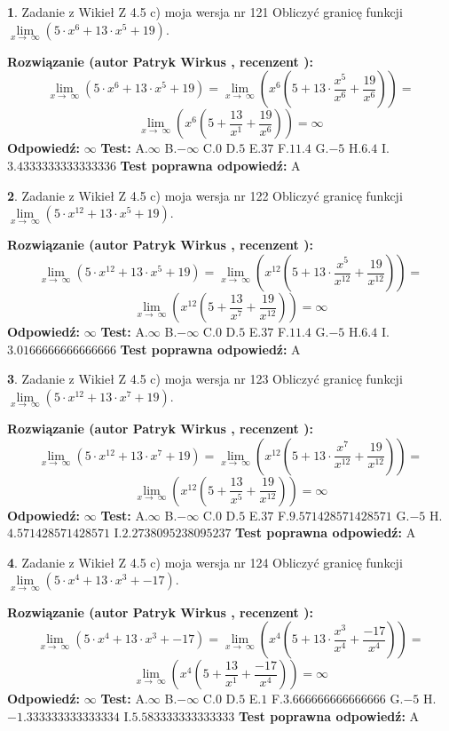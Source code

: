 \documentclass[12pt, a4paper]{article}
\theoremstyle{definition} %
\newtheorem{zad}{}
\newcommand{\zadStart}[1]{\begin{zad}#1\newline}
\newcommand{\zadStop}{\end{zad}}
\newcommand{\rozwStart}[2]{\noindent \textbf{Rozwiązanie (autor #1 , recenzent #2): }\newline}
\newcommand{\rozwStop}{\newline}
\newcommand{\odpStart}{\noindent \textbf{Odpowiedź:}\newline}
\newcommand{\odpStop}{\newline}
\newcommand{\testStart}{\noindent \textbf{Test:}\newline}
\newcommand{\testStop}{\newline}
\newcommand{\kluczStart}{\noindent \textbf{Test poprawna odpowiedź:}\newline}
\newcommand{\kluczStop}{\newline}
\begin{document}
\zadStart{Zadanie z Wikieł Z 4.5 c) moja wersja nr 121}
Obliczyć granicę funkcji  $\lim\limits_{x\to\ \infty}(5 \cdot x^{6}+13 \cdot x^{5}+19)$.
\zadStop
\rozwStart{Patryk Wirkus}{}
$$\lim\limits_{x\to\ \infty}(5 \cdot x^{6}+13 \cdot x^{5}+19) = \lim\limits_{x\to\ \infty}(x^{6}(5 +13 \cdot \frac{x^{5}}{x^{6}}+\frac{19}{x^{6}})) =$$ $$\lim\limits_{x\to\ \infty}(x^{6}(5 +\frac{13}{x^{1}}+\frac{19}{x^{6}})) =\infty$$
\rozwStop
\odpStart
$\infty$
\odpStop
\testStart
A.$\infty$ B.$-\infty$ C.$0$ D.$5$ E.$37$
F.$11.4$ G.$-5$
H.$6.4$
I.$3.4333333333333336$
\testStop
\kluczStart
A
\kluczStop



\zadStart{Zadanie z Wikieł Z 4.5 c) moja wersja nr 122}
Obliczyć granicę funkcji  $\lim\limits_{x\to\ \infty}(5 \cdot x^{12}+13 \cdot x^{5}+19)$.
\zadStop
\rozwStart{Patryk Wirkus}{}
$$\lim\limits_{x\to\ \infty}(5 \cdot x^{12}+13 \cdot x^{5}+19) = \lim\limits_{x\to\ \infty}(x^{12}(5 +13 \cdot \frac{x^{5}}{x^{12}}+\frac{19}{x^{12}})) =$$ $$\lim\limits_{x\to\ \infty}(x^{12}(5 +\frac{13}{x^{7}}+\frac{19}{x^{12}})) =\infty$$
\rozwStop
\odpStart
$\infty$
\odpStop
\testStart
A.$\infty$ B.$-\infty$ C.$0$ D.$5$ E.$37$
F.$11.4$ G.$-5$
H.$6.4$
I.$3.0166666666666666$
\testStop
\kluczStart
A
\kluczStop



\zadStart{Zadanie z Wikieł Z 4.5 c) moja wersja nr 123}
Obliczyć granicę funkcji  $\lim\limits_{x\to\ \infty}(5 \cdot x^{12}+13 \cdot x^{7}+19)$.
\zadStop
\rozwStart{Patryk Wirkus}{}
$$\lim\limits_{x\to\ \infty}(5 \cdot x^{12}+13 \cdot x^{7}+19) = \lim\limits_{x\to\ \infty}(x^{12}(5 +13 \cdot \frac{x^{7}}{x^{12}}+\frac{19}{x^{12}})) =$$ $$\lim\limits_{x\to\ \infty}(x^{12}(5 +\frac{13}{x^{5}}+\frac{19}{x^{12}})) =\infty$$
\rozwStop
\odpStart
$\infty$
\odpStop
\testStart
A.$\infty$ B.$-\infty$ C.$0$ D.$5$ E.$37$
F.$9.571428571428571$ G.$-5$
H.$4.571428571428571$
I.$2.2738095238095237$
\testStop
\kluczStart
A
\kluczStop



\zadStart{Zadanie z Wikieł Z 4.5 c) moja wersja nr 124}
Obliczyć granicę funkcji  $\lim\limits_{x\to\ \infty}(5 \cdot x^{4}+13 \cdot x^{3}+-17)$.
\zadStop
\rozwStart{Patryk Wirkus}{}
$$\lim\limits_{x\to\ \infty}(5 \cdot x^{4}+13 \cdot x^{3}+-17) = \lim\limits_{x\to\ \infty}(x^{4}(5 +13 \cdot \frac{x^{3}}{x^{4}}+\frac{-17}{x^{4}})) =$$ $$\lim\limits_{x\to\ \infty}(x^{4}(5 +\frac{13}{x^{1}}+\frac{-17}{x^{4}})) =\infty$$
\rozwStop
\odpStart
$\infty$
\odpStop
\testStart
A.$\infty$ B.$-\infty$ C.$0$ D.$5$ E.$1$
F.$3.666666666666666$ G.$-5$
H.$-1.333333333333334$
I.$5.583333333333333$
\testStop
\kluczStart
A
\kluczStop
\end{document}
